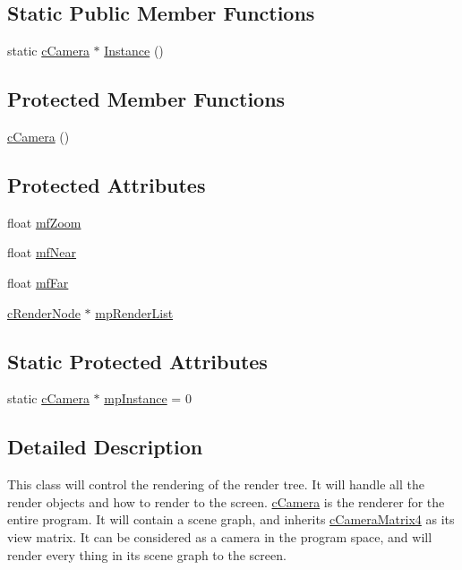 \subsection*{Static Public Member Functions}
\begin{DoxyCompactItemize}
\item 
static \hyperlink{classc_camera}{cCamera} $\ast$ \hyperlink{classc_camera_ac15b7642fea57e1d1af11ad5f77baa91}{Instance} ()
\end{DoxyCompactItemize}
\subsection*{Protected Member Functions}
\begin{DoxyCompactItemize}
\item 
\hyperlink{classc_camera_a5e6f4b4780dd0f64235839879e32aea9}{cCamera} ()
\end{DoxyCompactItemize}
\subsection*{Protected Attributes}
\begin{DoxyCompactItemize}
\item 
float \hyperlink{classc_camera_ae3aaabc945a5b4a0bb424e38d32f6d58}{mfZoom}
\item 
float \hyperlink{classc_camera_ac50aeb9d20f87444d1b45b1897df206e}{mfNear}
\item 
float \hyperlink{classc_camera_a4b347cfcd47002f6f80673bda5fdfcf8}{mfFar}
\item 
\hyperlink{classc_render_node}{cRenderNode} $\ast$ \hyperlink{classc_camera_a642cdd541d3837608830f2b851bcd8d0}{mpRenderList}
\end{DoxyCompactItemize}
\subsection*{Static Protected Attributes}
\begin{DoxyCompactItemize}
\item 
static \hyperlink{classc_camera}{cCamera} $\ast$ \hyperlink{classc_camera_ac0a7186d4db80f12a986a00b8fde2b2d}{mpInstance} = 0
\end{DoxyCompactItemize}


\subsection{Detailed Description}
This class will control the rendering of the render tree. It will handle all the render objects and how to render to the screen. \hyperlink{classc_camera}{cCamera} is the renderer for the entire program. It will contain a scene graph, and inherits \hyperlink{classc_camera_matrix4}{cCameraMatrix4} as its view matrix. It can be considered as a camera in the program space, and will render every thing in its scene graph to the screen. 

